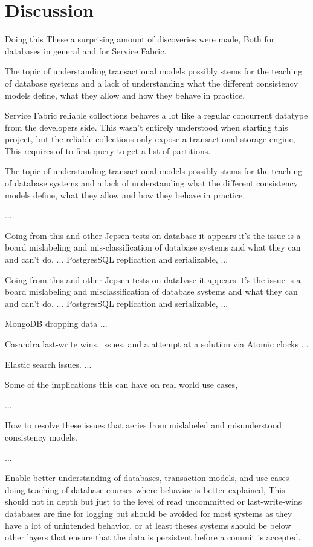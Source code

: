 \documentclass[a4paper,10pt,titlepage]{report}
\begin{document}
\chapter{Discussion}


Doing this These a surprising amount of discoveries were made, Both for databases in general and for Service Fabric.


The topic of understanding transactional models possibly stems for the teaching of database systems and a lack of understanding what the different consistency models define, what they allow and how they behave in practice,


Service Fabric reliable collections behaves a lot like a regular concurrent datatype from the developers side. This wasn't entirely understood when starting this project, but the reliable collections only expose a transactional storage engine, This requires of to first query to get a list of partitions.
    
    

The topic of understanding transactional models possibly stems for the teaching of database systems and a lack of understanding what the different consistency models define, what they allow and how they behave in practice,

....

Going from this and other Jepsen tests on database it appears it's the issue is a board mislabeling and mis-classification of database systems and what they can and can't do.
...
PostgresSQL replication and serializable,
...

Going from this and other Jepsen tests on database it appears it's the issue is a board mislabeling and misclassification of database systems and what they can and can't do.
...
PostgresSQL replication and serializable,
...

MongoDB dropping data
...

Casandra last-write wins, issues, and a attempt at a solution via Atomic clocks
...

Elastic search issues.
...

Some of the implications this can have on real world use cases,

...

How to resolve these issues that aeries from mislabeled and misunderstood consistency models.

...

Enable better understanding of databases, transaction models, and use cases doing teaching of database courses where behavior is better explained, This should not in depth but just to the level of read uncommitted or last-write-wins databases are fine for logging but should be avoided for most systems as they have a lot of unintended behavior, or at least theses systems should be below other layers that ensure that the data is persistent before a commit is accepted.
\end{document}

